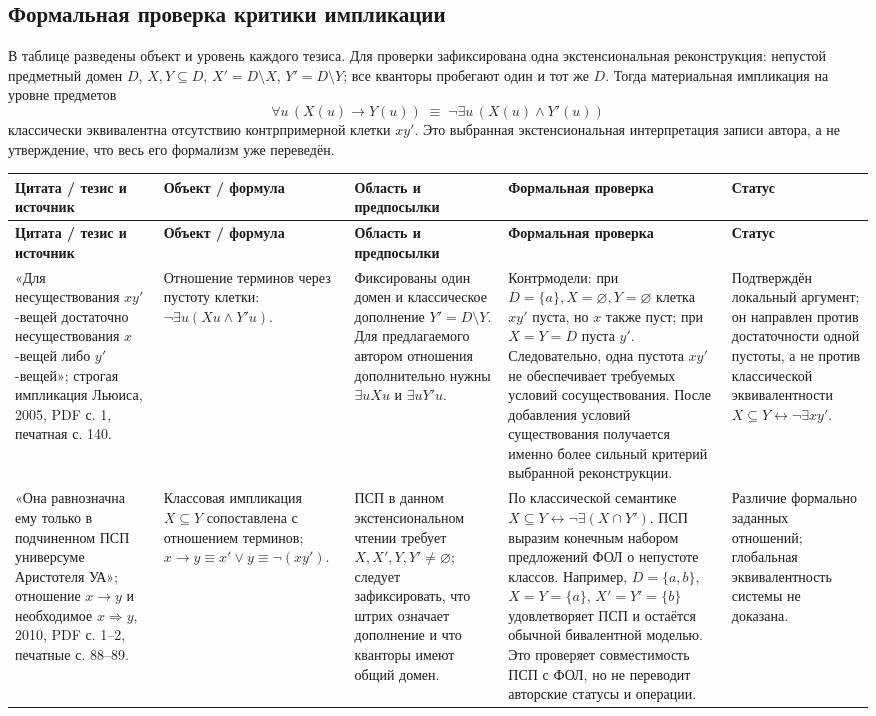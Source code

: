 \documentclass[12pt,a4paper]{article}
\begin{document}
\subsection*{Формальная проверка критики импликации}

В таблице разведены объект и уровень каждого тезиса. Для проверки зафиксирована одна экстенсиональная реконструкция: непустой предметный домен \(D\), \(X,Y\subseteq D\), \(X'=D\setminus X\), \(Y'=D\setminus Y\); все кванторы пробегают один и тот же \(D\). Тогда материальная импликация на уровне предметов
\[
\forall u\,(X(u)\to Y(u))\;\equiv\;\neg\exists u\,(X(u)\land Y'(u))
\]
классически эквивалентна отсутствию контрпримерной клетки \(xy'\). Это выбранная экстенсиональная интерпретация записи автора, а не утверждение, что весь его формализм уже переведён.

{\small
\begin{longtable}{P{0.18\textwidth}P{0.15\textwidth}P{0.25\textwidth}P{0.25\textwidth}P{0.11\textwidth}}
\toprule
\textbf{Цитата / тезис и источник} & \textbf{Объект / формула} & \textbf{Область и предпосылки} & \textbf{Формальная проверка} & \textbf{Статус} \\
\midrule
\endfirsthead
\toprule
\textbf{Цитата / тезис и источник} & \textbf{Объект / формула} & \textbf{Область и предпосылки} & \textbf{Формальная проверка} & \textbf{Статус} \\
\midrule
\endhead
«Для несуществования \(xy'\)-вещей достаточно несуществования \(x\)-вещей либо \(y'\)-вещей»; строгая импликация Льюиса, 2005, PDF с. 1, печатная с. 140. & Отношение терминов через пустоту клетки: \(\neg\exists u(Xu\land Y'u)\). & Фиксированы один домен и классическое дополнение \(Y'=D\setminus Y\). Для предлагаемого автором отношения дополнительно нужны \(\exists uXu\) и \(\exists uY'u\). & Контрмодели: при \(D=\{a\}, X=\varnothing,Y=\varnothing\) клетка \(xy'\) пуста, но \(x\) также пуст; при \(X=Y=D\) пуста \(y'\). Следовательно, одна пустота \(xy'\) не обеспечивает требуемых условий сосуществования. После добавления условий существования получается именно более сильный критерий выбранной реконструкции. & Подтверждён локальный аргумент; он направлен против достаточности одной пустоты, а не против классической эквивалентности \(X\subseteq Y\leftrightarrow\neg\exists xy'\). \\
«Она равнозначна ему только в подчиненном ПСП универсуме Аристотеля УА»; отношение \(x\to y\) и необходимое \(x\Rightarrow y\), 2010, PDF с. 1–2, печатные с. 88–89. & Классовая импликация \(X\subseteq Y\) сопоставлена с отношением терминов; \(x\to y\equiv x'\lor y\equiv\neg(xy')\). & ПСП в данном экстенсиональном чтении требует \(X,X',Y,Y'\ne\varnothing\); следует зафиксировать, что штрих означает дополнение и что кванторы имеют общий домен. & По классической семантике \(X\subseteq Y\leftrightarrow\neg\exists(X\cap Y')\). ПСП выразим конечным набором предложений ФОЛ о непустоте классов. Например, \(D=\{a,b\}\), \(X=Y=\{a\}\), \(X'=Y'=\{b\}\) удовлетворяет ПСП и остаётся обычной бивалентной моделью. Это проверяет совместимость ПСП с ФОЛ, но не переводит авторские статусы и операции. & Различие формально заданных отношений; глобальная эквивалентность системы не доказана. \\

\end{longtable}}
\end{document}
